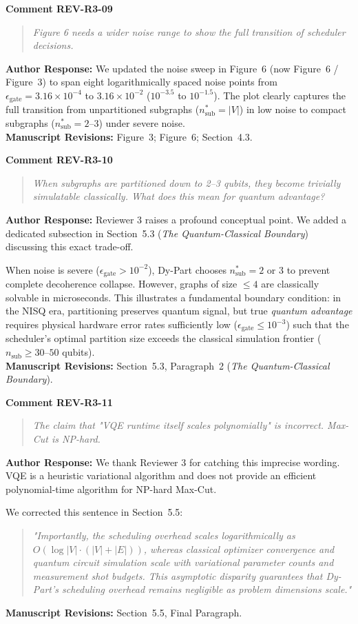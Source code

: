 \documentclass[11pt,a4paper]{article}
\newcommand{\commentbox}[2]{
    \vspace{0.8em}
    \noindent\textbf{\textcolor{commentcolor}{#1}}
    \vspace{0.2em}
    \begin{quote}
        \small\itshape #2
    \end{quote}
}
\newcommand{\responsebox}[1]{
    \noindent\textbf{\textcolor{responsecolor}{Author Response:}} #1
    \vspace{0.8em}
}
\begin{document}
\commentbox{Comment REV-R3-09}{Figure 6 needs a wider noise range to show the full transition of scheduler decisions.}

\responsebox{We updated the noise sweep in Figure~6 (now Figure~6 / Figure~3) to span eight logarithmically spaced noise points from $\epsilon_{\text{gate}} = 3.16 \times 10^{-4}$ to $3.16 \times 10^{-2}$ ($10^{-3.5}$ to $10^{-1.5}$). The plot clearly captures the full transition from unpartitioned subgraphs ($n_{\text{sub}}^* = |V|$) in low noise to compact subgraphs ($n_{\text{sub}}^* = 2\text{--}3$) under severe noise.
\\[0.3em]
\textbf{Manuscript Revisions:} Figure~3; Figure~6; Section~4.3.}

\commentbox{Comment REV-R3-10}{When subgraphs are partitioned down to 2–3 qubits, they become trivially simulatable classically. What does this mean for quantum advantage?}

\responsebox{Reviewer 3 raises a profound conceptual point. We added a dedicated subsection in Section~5.3 (\textit{The Quantum-Classical Boundary}) discussing this exact trade-off.

When noise is severe ($\epsilon_{\text{gate}} > 10^{-2}$), Dy-Part chooses $n_{\text{sub}}^* = 2$ or $3$ to prevent complete decoherence collapse. However, graphs of size $\le 4$ are classically solvable in microseconds. This illustrates a fundamental boundary condition: in the NISQ era, partitioning preserves quantum signal, but true \textit{quantum advantage} requires physical hardware error rates sufficiently low ($\epsilon_{\text{gate}} \le 10^{-3}$) such that the scheduler's optimal partition size exceeds the classical simulation frontier ($n_{\text{sub}} \ge 30\text{--}50$ qubits).
\\[0.3em]
\textbf{Manuscript Revisions:} Section~5.3, Paragraph~2 (\textit{The Quantum-Classical Boundary}).}

\commentbox{Comment REV-R3-11}{The claim that "VQE runtime itself scales polynomially" is incorrect. Max-Cut is NP-hard.}

\responsebox{We thank Reviewer 3 for catching this imprecise wording. VQE is a heuristic variational algorithm and does not provide an efficient polynomial-time algorithm for NP-hard Max-Cut.

We corrected this sentence in Section~5.5:
\begin{quote}
\textit{"Importantly, the scheduling overhead scales logarithmically as $O(\log |V| \cdot (|V| + |E|))$, whereas classical optimizer convergence and quantum circuit simulation scale with variational parameter counts and measurement shot budgets. This asymptotic disparity guarantees that Dy-Part's scheduling overhead remains negligible as problem dimensions scale."}
\end{quote}
\textbf{Manuscript Revisions:} Section~5.5, Final Paragraph.}
\end{document}
